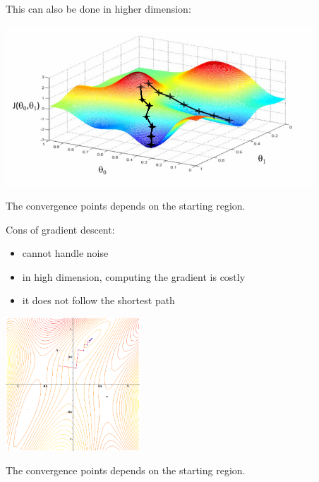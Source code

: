 \documentclass{beamer}
\begin{document}
\begin{frame}{}
This can also be done in higher dimension:\\
\vspace{5mm}
\begin{center}
\includegraphics[height=6cm]{figures/grad_desc2}
\end{center}
The convergence points depends on the starting region.
\end{frame}

\begin{frame}{}
Cons of gradient descent:
\begin{itemize}
	\item cannot handle noise
	\item in high dimension, computing the gradient is costly
 	\item it does not follow the shortest path
 \end{itemize} 
\begin{center}
\includegraphics[height=5cm]{figures/grad_desc3}
\end{center}
\begin{center}
The convergence points depends on the starting region.
\end{center}
\end{frame}
\end{document}
